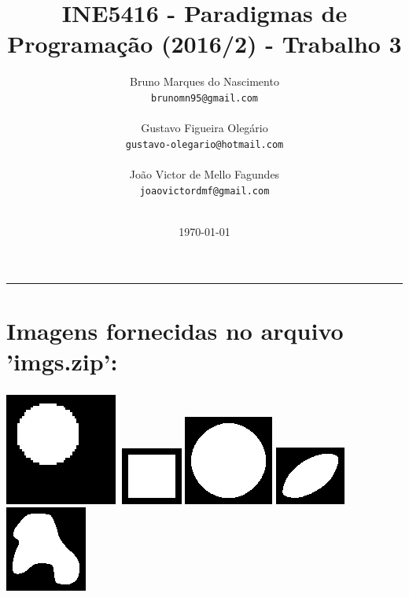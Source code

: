 \documentclass{article}
\title{INE5416 - Paradigmas de Programação (2016/2) - Trabalho 3}
\author{
	Bruno Marques do Nascimento\\
	\texttt{brunomn95@gmail.com}\\
	\\ 
	Gustavo Figueira Olegário\\
	\texttt{gustavo-olegario@hotmail.com}\\
	\\
	João Victor de Mello Fagundes\\
	\texttt{joaovictordmf@gmail.com}\\
	\\
}
\date{\today}
\begin{document}
\maketitle

\noindent\rule{16cm}{0.4pt}

\section*{Imagens fornecidas no arquivo 'imgs.zip':}
\paragraph{}

\begin{center}
\includegraphics[scale=1.00]{texImgs/img1.eps}
\includegraphics[scale=1.00]{texImgs/img2.eps}
\includegraphics[scale=1.00]{texImgs/img3.eps}
\includegraphics[scale=1.00]{texImgs/img4.eps}
\includegraphics[scale=1.00]{texImgs/img5.eps}
\end{center}
\end{document}
